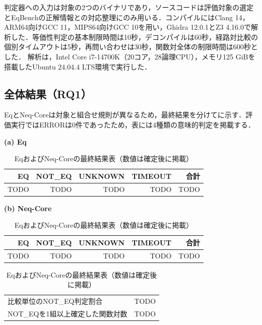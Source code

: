 判定器への入力は対象の2つのバイナリであり，ソースコードは評価対象の選定とEqBenchの正解情報との対応整理にのみ用いる．コンパイルにはClang 14，ARM64向けGCC 11，MIPS64向けGCC 10を用い，Ghidra 12.0.1とZ3 4.16.0で解析した．等価性判定の基本制限時間は10秒，デコンパイルは60秒，経路対比較の個別タイムアウトは5秒，再問い合わせは30秒，関数対全体の制限時間は600秒とした．
解析は，Intel Core i7-14700K（20コア，28論理CPU），メモリ125 GiBを搭載したUbuntu 24.04.4 LTS環境で実行した．

\subsection{全体結果（RQ1）}
EqとNeq-Coreは対象と組合せ規則が異なるため，最終結果を分けてに示す．評価実行ではERRORは0件であったため，表には4種類の意味的判定を掲載する．

\begin{table}[t]
\centering
\caption{EqおよびNeq-Coreの最終結果表（数値は確定後に掲載）}
\label{tab:rq1-results}
\footnotesize
\setlength{\tabcolsep}{2.5pt}
\begin{minipage}[t]{0.47\textwidth}
\centering
\textbf{(a) Eq}\par\smallskip
\begin{tabular}{@{}rrrrr@{}}
\hline\hline
EQ & NOT\_EQ & UNKNOWN & TIMEOUT & 合計 \\
\hline
TODO & TODO & TODO & TODO & TODO \\
\hline
\end{tabular}
\end{minipage}
\hfill
\begin{minipage}[t]{0.49\textwidth}
\centering
\textbf{(b) Neq-Core}\par\smallskip
\begin{tabular}{@{}rrrrr@{}}
\hline\hline
EQ & NOT\_EQ & UNKNOWN & TIMEOUT & 合計 \\
\hline
TODO & TODO & TODO & TODO & TODO \\
\hline
\end{tabular}
\par\smallskip
\begin{tabular}{@{}lr@{}}
比較単位のNOT\_EQ判定割合 & TODO \\
NOT\_EQを1組以上確定した関数対数 & TODO \\
\end{tabular}
\end{minipage}
\end{table}

